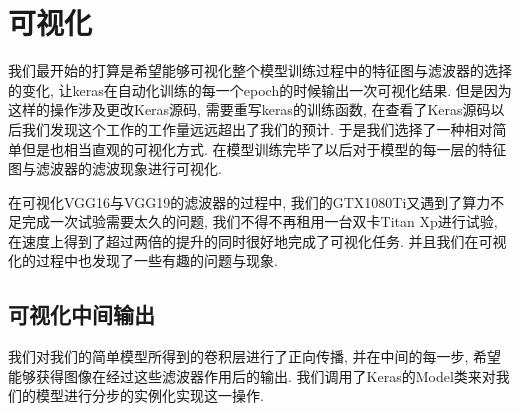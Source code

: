 \documentclass[lang=cn,11pt]{elegantpaper}
\begin{document}
\section{可视化}

我们最开始的打算是希望能够可视化整个模型训练过程中的特征图与滤波器的选择的变化, 让keras在自动化训练的每一个epoch的时候输出一次可视化结果. 但是因为这样的操作涉及更改Keras源码, 需要重写keras的训练函数, 在查看了Keras源码以后我们发现这个工作的工作量远远超出了我们的预计. 于是我们选择了一种相对简单但是也相当直观的可视化方式. 在模型训练完毕了以后对于模型的每一层的特征图与滤波器的滤波现象进行可视化.

在可视化VGG16与VGG19的滤波器的过程中, 我们的GTX1080Ti又遇到了算力不足完成一次试验需要太久的问题, 我们不得不再租用一台双卡Titan Xp进行试验, 在速度上得到了超过两倍的提升的同时很好地完成了可视化任务. 并且我们在可视化的过程中也发现了一些有趣的问题与现象.



\subsection{可视化中间输出}

我们对我们的简单模型所得到的卷积层进行了正向传播, 并在中间的每一步, 希望能够获得图像在经过这些滤波器作用后的输出. 我们调用了Keras的Model类来对我们的模型进行分步的实例化实现这一操作.
\end{document}

